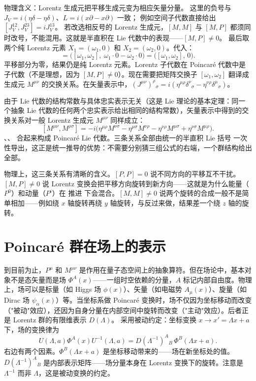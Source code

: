 物理含义：Lorentz 生成元把平移生成元变为相应矢量分量。
这里的负号与 $J_V=i(\eta\delta-\eta\delta)$、$L=i(x\partial-x\partial)$ 一致；
例如空间子代数直接给出 $[J_V^{12},J_V^{23}]=iJ_V^{13}$。
若改选相反号的 Lorentz 生成元，$[M,M]$ 与 $[M,P]$ 都须同时改号，不能混用。这就是半直积在 Lie 代数中的表现——$[M,P]\neq 0$。
最后取两个纯 Lorentz 元素 $X_1=(\omega_1,0)$ 和 $X_2=(\omega_2,0)$。代入：
\begin{equation*}
[(\omega_1,0),(\omega_2,0)]=\big([\omega_1,\omega_2],\;\omega_1\cdot 0-\omega_2\cdot 0\big)=\big([\omega_1,\omega_2],\,0\big).
\end{equation*}
平移部分为零，结果仍是纯 Lorentz 元素。Lorentz 子代数在 Poincaré 代数中是子代数（不是理想，因为 $[M,P]\neq 0$）。现在需要把矩阵交换子 $[\omega_1,\omega_2]$ 翻译成生成元 $M^{\mu\nu}$ 的交换关系。在矢量表示中，$(J^{\mu\nu})^\rho{}_\sigma=i(\eta^{\mu\rho}\delta^\nu{}_\sigma-\eta^{\nu\rho}\delta^\mu{}_\sigma)$。

由于 Lie 代数的结构常数与具体忠实表示无关（这是 Lie 理论的基本定理：同一个抽象 Lie 代数的任何两个忠实表示给出相同的结构常数），矢量表示中得到的交换关系对一般 Lorentz 生成元 $M^{\mu\nu}$ 同样成立：
\begin{equation}\label{eq:ms-poincare-MM}
\boxed{
[M^{\mu\nu},M^{\rho\sigma}]=-i\big(\eta^{\mu\rho}M^{\nu\sigma}-\eta^{\mu\sigma}M^{\nu\rho}-\eta^{\nu\rho}M^{\mu\sigma}+\eta^{\nu\sigma}M^{\mu\rho}\big).
}
\end{equation}
、、 合起来构成 Poincaré Lie 代数。三条关系全部由统一的半直积 Lie 括号 一次性导出，这正是统一推导的优势：不需要分别猜三组公式的右端，一个群结构给出全部。

物理上，这三条关系有清晰的含义。$[P,P]=0$ 说不同方向的平移互不干扰。$[M,P]\neq 0$ 说 Lorentz 变换会把平移方向旋转到新方向——这就是为什么能量（$P^0$）和动量（$P^i$）在 推进 下会混合。$[M,M]\neq 0$ 说两个旋转的合成一般不是简单相加——例如绕 $x$ 轴旋转再绕 $y$ 轴旋转，与反过来做，结果差一个绕 $z$ 轴的旋转。

\section{Poincaré 群在场上的表示}
到目前为止，$P^\mu$ 和 $M^{\mu\nu}$ 是作用在量子态空间上的抽象算符。但在场论中，基本对象不是态矢量而是场 $\Phi^A(x)$——一组时空依赖的分量，$A$ 标记内部自由度。物理上，场可以是标量（如 Higgs 场 $\phi(x)$）、矢量（如电磁势 $A_\mu(x)$）、旋量（如 Dirac 场 $\psi_\alpha(x)$）等。当坐标系做 Poincaré 变换时，场不仅因为坐标移动而改变（"被动"效应），还因为自身分量在内部空间中旋转而改变（"主动"效应）。后者正是 Lorentz 群的有限维表示 $D(\Lambda)$。
采用被动约定：坐标变换 $x\to x'=\Lambda x+a$ 下，场的变换律为
\begin{equation}\label{eq:ms-poincare-field-transform}
\boxed{
U(\Lambda,a)\Phi^A(x)U^{-1}(\Lambda,a)=D(\Lambda^{-1})^A{}_B\,\Phi^B(\Lambda x+a).
}
\end{equation}
右边有两个因素。$\Phi^B(\Lambda x+a)$ 是坐标移动带来的——场在新坐标处的值。$D(\Lambda^{-1})^A{}_B$ 是内部表示矩阵——场分量本身在 Lorentz 变换下的旋转。注意是 $\Lambda^{-1}$ 而非 $\Lambda$，这是被动变换的约定。

